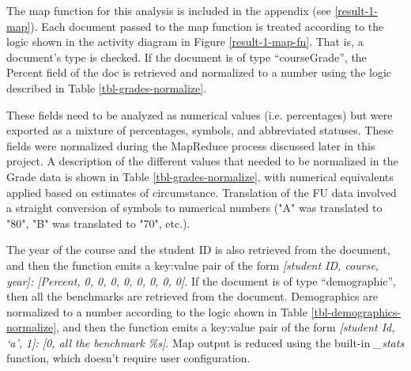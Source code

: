 The map function for this analysis is included in  the appendix (see \ref{result-1-map}). Each document passed to the map function is treated according to the logic shown in the activity diagram in Figure \ref{result-1-map-fn}. That is, a document's type is checked. If the document is of type ``courseGrade'', the Percent field of the doc is retrieved and normalized to a number using the logic described in Table \ref{tbl-grades-normalize}.

These fields need to be analyzed as numerical values (i.e. percentages) but were exported as a mixture of percentages, symbols, and abbreviated statuses. These fields were normalized during the MapReduce process discussed later in this project. A description of the different values that needed to be normalized in the Grade data is shown in Table \ref{tbl-grades-normalize}, with numerical equivalents applied based on estimates of circumstance. Translation of the FU data involved a straight conversion of symbols to numerical numbers ("A" was translated to "80", "B" was translated to "70", etc.).



The year of the course and the student ID is also retrieved from the document, and then the function emits a key:value pair of the form \textit{[student ID, course, year]: [Percent, 0, 0, 0, 0, 0, 0, 0, 0]}. If the document is of type ``demographic'', then all the benchmarks are retrieved from the document. Demographics are normalized to a number according to the logic shown in Table  \ref{tbl-demographics-normalize}, and then the function emits a key:value pair of the form \textit{[student Id, `a', 1]: [0, all the benchmark \%s]}. Map output is reduced using the built-in \textit{\_stats} function, which doesn't require user configuration.

